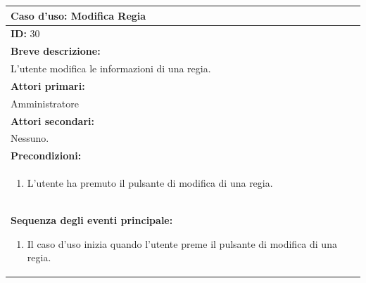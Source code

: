 \documentclass{article}
\begin{document}
                \begin{table}[H]
                    \begin{tabular}{|p{\linewidth}|}
                        \hline
                        \cellcolor{gray!100}
                        \color{white}
                        \centerline{\textbf{Caso d'uso:} Modifica Regia} \\
                        \hline
                        \textbf{ID:} 30 \\
                        \hline
                        \cellcolor{gray!20}
                        \textbf{Breve descrizione:} \\
                        \cellcolor{gray!20}
                        L'utente modifica le informazioni di una regia. \\
                        \hline
                        \textbf{Attori primari:} \\
                        \begin{minipage}{\linewidth}
                            Amministratore
                        \end{minipage}
                        \vspace{-10pt} \\  %
                        \hline
                        \textbf{Attori secondari:} \\
                        Nessuno. \\
                        \hline
                        \cellcolor{gray!20}
                        \textbf{Precondizioni:} \\
                        \cellcolor{gray!20}
                        \begin{minipage}{\linewidth}
                            \begin{enumerate}
                                \item L'utente ha premuto il pulsante di modifica di una regia.
                            \end{enumerate}
                        \end{minipage} \\
                        \hline
                        \textbf{Sequenza degli eventi principale:}
                        \begin{enumerate}
                            \item Il caso d'uso inizia quando l'utente preme il pulsante di modifica di una regia.

\end{enumerate}
\end{tabular}
\end{table}
\end{document}
